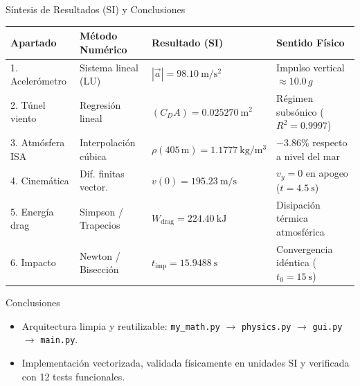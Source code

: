 \documentclass[aspectratio=169, 10pt]{beamer}
\begin{document}
\begin{frame}{Síntesis de Resultados (SI) y Conclusiones}
    \centering
    \footnotesize
    \begin{tabular}{@{}llll@{}}
        \toprule
        \textbf{Apartado} & \textbf{Método Numérico} & \textbf{Resultado (SI)} & \textbf{Sentido Físico} \\
        \midrule
        1. Acelerómetro & Sistema lineal (LU) & $|\vec{a}| = 98.10\ \mathrm{m/s^2}$ & Impulso vertical $\approx 10.0\,g$ \\
        2. Túnel viento & Regresión lineal & $(C_D A) = 0.025270\ \mathrm{m^2}$ & Régimen subsónico ($R^2=0.9997$) \\
        3. Atmósfera ISA & Interpolación cúbica & $\rho(405\,\mathrm{m}) = 1.1777\ \mathrm{kg/m^3}$ & $-3.86\%$ respecto a nivel del mar \\
        4. Cinemática & Dif. finitas vector. & $v(0)=195.23\ \mathrm{m/s}$ & $v_y=0$ en apogeo ($t=4.5\ \mathrm{s}$) \\
        5. Energía drag & Simpson / Trapecios & $W_{\text{drag}} = 224.40\ \mathrm{kJ}$ & Disipación térmica atmosférica \\
        6. Impacto & Newton / Bisección & $t_{\text{imp}} = 15.9488\ \mathrm{s}$ & Convergencia idéntica ($t_0=15\ \mathrm{s}$) \\
        \bottomrule
    \end{tabular}

    \vspace{0.35cm}
    \begin{block}{Conclusiones}
        \begin{itemize}
            \item Arquitectura limpia y reutilizable: \texttt{my\_math.py} $\rightarrow$ \texttt{physics.py} $\rightarrow$ \texttt{gui.py} $\rightarrow$ \texttt{main.py}.
            \item Implementación vectorizada, validada físicamente en unidades SI y verificada con 12 tests funcionales.
        \end{itemize}
    \end{block}
\end{frame}
\end{document}
